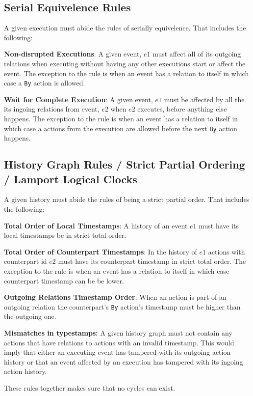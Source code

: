 	\subsection{Serial Equivelence Rules}
	A given execution must abide the rules of serially equivelence. That includes the following:
	
	\newpar \textbf{Non-disrupted Executions}: A given event, $e1$ must affect all of its outgoing relations when executing without having any other executions start or affect the event. The exception to the rule is when an event has a relation to itself in which case a \texttt{By} action is allowed.
	
	\newpar \textbf{Wait for Complete Execution}: A given event, $e1$ must be affected by all the its ingoing relations from event, $e2$ when $e2$ executes, before anything else happens. The exception to the rule is when an event has a relation to itself in which case a actions from the execution are allowed before the next \texttt{By} action happens. 
	
	\subsection{History Graph Rules / Strict Partial Ordering / Lamport Logical Clocks}
	A given history must abide the rules of being a strict partial order. That includes the following:
	
	\newpar \textbf{Total Order of Local Timestamps}: A history of an event $e1$ must have its local timestamps be in strict total order.
	
	\newpar \textbf{Total Order of Counterpart Timestamps}: In the history of $e1$ actions with counterpart id $e2$ must have its counterpart timestamp in strict total order.  The exception to the rule is when an event has a relation to itself in which case counterpart timestamp can be be lower. 
	
	\newpar \textbf{Outgoing Relations Timestamp Order}: When an action is part of an outgoing relation the counterpart's \texttt{By} action's timestamp must be higher than the outgoing one. 
	
	\newpar \textbf{Mismatches in typestamps:} A given history graph must not contain any actions that have relations to actions with an invalid timestamp. This would imply that either an executing event has tampered with its outgoing action history or that an event affected by an execution has tampered with its ingoing action history. 
	
	\newpar These rules together makes sure that no cycles can exist.
	
